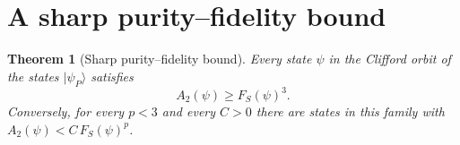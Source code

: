 \documentclass[a4paper,onecolumn,11pt,unpublished]{quantumarticle}
\theoremstyle{plain}
\newtheorem{theorem}{Theorem}
\theoremstyle{remark}
\newcommand{\ket}[1]{|#1\rangle}
\begin{document}
\section{A sharp purity--fidelity bound}\label{sec:sharp}

\begin{theorem}[Sharp purity--fidelity bound]\label{thm:sharp}
Every state $\psi$ in the Clifford orbit of the states $\ket{\psi_P}$ satisfies
\begin{equation}\label{eq:sharp}
A_2(\psi)\ge F_S(\psi)^3 .
\end{equation}
Conversely, for every $p<3$ and every $C>0$ there are states in this family with $A_2(\psi)<C\,F_S(\psi)^p$.
\end{theorem}
\end{document}
